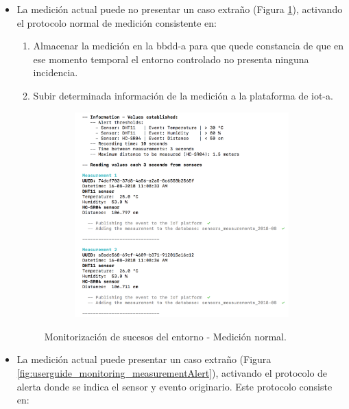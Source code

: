 \documentclass[12pt,a4paper, twoside]{report}
\begin{document}
	 \begin{itemize}
	 	\item La medición actual puede no presentar un caso extraño (Figura \ref{fig:userguide_monitoring_measurementOk}), activando el protocolo normal de medición consistente en:
	 	
	 		\begin{enumerate}
				\item Almacenar la medición en la \gls{bbdd-a} para que quede constancia de que en ese momento temporal el entorno controlado no presenta ninguna incidencia.
				\item Subir determinada información de la medición a la plataforma de \gls{iot-a}.	
			\end{enumerate}
			
			\begin{figure}[!ht]   
				\caption{Monitorización de sucesos del entorno - Medición normal.} 
				\begin{center} 
					\includegraphics[width=12cm,height=7.9cm]{Images/userGuide/monitoring/measurementOk} \\
					\label{fig:userguide_monitoring_measurementOk} 
				\end{center}  
			\end{figure}	 
	 	
	 	\item La medición actual puede presentar un caso extraño (Figura \ref{fig:userguide_monitoring_measurementAlert}), activando el protocolo de alerta donde se indica el \gls{sensor} y evento originario. Este protocolo consiste en:
	 	 	

\end{itemize}
\end{document}
